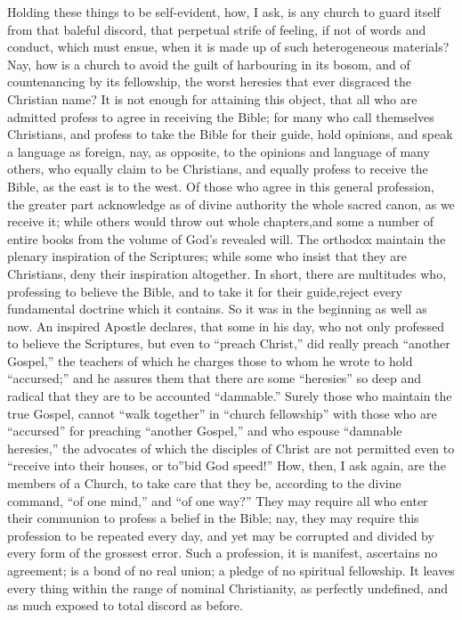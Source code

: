 \documentclass[
]{book}
\begin{document}
Holding these things to be self-evident, how, I ask, is any church to guard itself from that baleful discord, that perpetual strife of feeling, if not of words and conduct, which must ensue, when it is made up of such heterogeneous materials? Nay, how is a church to avoid the guilt of harbouring in its bosom, and of countenancing by its fellowship, the worst heresies that ever disgraced the Christian name? It is not enough for attaining this object, that all who are admitted profess to agree in receiving the Bible; for many who call themselves Christians, and profess to take the Bible for their guide, hold opinions, and speak a language as foreign, nay, as opposite, to the opinions and language of many others, who equally claim to be Christians, and equally profess to receive the Bible, as the east is to the west. Of those who agree in this general profession, the greater part acknowledge as of divine authority the whole sacred canon, as we receive it; while others would throw out whole chapters,and some a number of entire books from the volume of God's revealed will. The orthodox maintain the plenary inspiration of the Scriptures; while some who insist that they are Christians, deny their inspiration altogether. In short, there are multitudes who, professing to believe the Bible, and to take it for their guide,reject every fundamental doctrine which it contains. So it was in the beginning as well as now. An inspired Apostle declares, that some in his day, who not only professed to believe the Scriptures, but even to ``preach Christ,'' did really preach ``another Gospel,'' the teachers of which he charges those to whom he wrote to hold ``accursed;'' and he assures them that there are some ``heresies'' so deep and radical that they are to be accounted ``damnable.'' Surely those who maintain the true Gospel, cannot ``walk together'' in ``church fellowship'' with those who are ``accursed'' for preaching ``another Gospel,'' and who espouse ``damnable heresies,'' the advocates of which the disciples of Christ are not permitted even to ``receive into their houses, or to''bid God speed!'' How, then, I ask again, are the members of a Church, to take care that they be, according to the divine command, ``of one mind,'' and ``of one way?'' They may require all who enter their communion to profess a belief in the Bible; nay, they may require this profession to be repeated every day, and yet may be corrupted and divided by every form of the grossest error. Such a profession, it is manifest, ascertains no agreement; is a bond of no real union; a pledge of no spiritual fellowship. It leaves every thing within the range of nominal Christianity, as perfectly undefined, and as much exposed to total discord as before.
\end{document}
